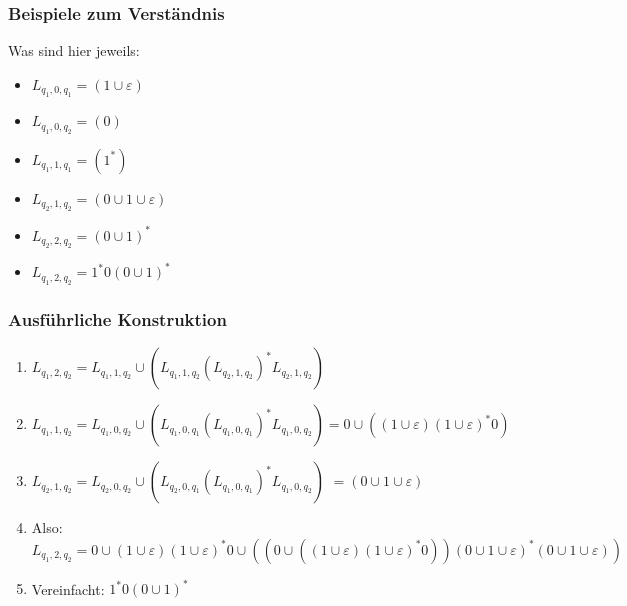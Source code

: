 
\begin{frame}
\frametitle{Beispiele zum Verständnis}
\begin{figure}[H]
\begin{center}
\end{center}
\end{figure}

Was sind hier jeweils:

\begin{itemize}
\item $L_{q_1,0,q_1}$\pause $ = (1\cup\varepsilon)$
\item $L_{q_1,0,q_2}$\pause $ = (0)$
\item $L_{q_1,1,q_1}$\pause $ = (1^*)$
\item $L_{q_2,1,q_2}$\pause $ = (0\cup1\cup\varepsilon)$
\item $L_{q_2,2,q_2}$\pause $ = (0\cup1)^*$
\item $L_{q_1,2,q_2}$\pause $ = 1^*0(0\cup1)^*$
\end{itemize}
\end{frame}


\begin{frame}
\frametitle{Ausführliche Konstruktion}
\begin{figure}[H]
\begin{center}
\end{center}
\end{figure}
\begin{enumerate}
\item $L_{q_1,2,q_2} = L_{q_1,1,q_2}\cup(L_{q_1,1,q_2}(L_{q_2,1,q_2})^*L_{q_2,1,q_2})$
\item $L_{q_1,1,q_2} = L_{q_1,0,q_2}\cup(L_{q_1,0,q_1}(L_{q_1,0,q_1})^*L_{q_1,0,q_2}) = 0\cup((1\cup\varepsilon)(1\cup\varepsilon)^*0)$
\item $L_{q_2,1,q_2} = L_{q_2,0,q_2}\cup(L_{q_2,0,q_1}(L_{q_1,0,q_1})^*L_{q_1,0,q_2})$ $ = (0\cup1\cup\varepsilon)$
\item Also: $L_{q_1,2,q_2} = 0\cup(1\cup\varepsilon)(1\cup\varepsilon)^*0\cup((0\cup((1\cup\varepsilon)(1\cup\varepsilon)^*0))(0\cup1\cup\varepsilon)^*(0\cup1\cup\varepsilon))$
\item Vereinfacht: $1^*0(0\cup1)^*$
\end{enumerate}
\end{frame}

